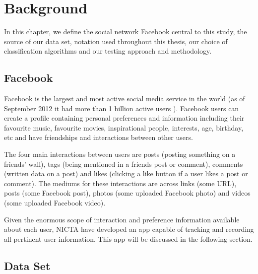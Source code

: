 
\chapter{Background}
\label{cha:back}

In this chapter, we define the social network Facebook central to this study, the source of our data set, notation used throughout 
this thesis, our choice of classification algorithms and our testing approach and methodology.

\section{Facebook}
\label{sec:data}

Facebook is the largest and most active social media service in the world (as of September 2012 it had more than 1 billion active users \cite{fbzise}).
Facebook users can create a profile containing personal preferences and information including their favourite music, favourite movies, 
inspirational people, interests, age, birthday, etc and have friendships and interactions between other users. 

The four main interactions between users are posts (posting something on a friends' wall), 
tags (being mentioned in a friends post or comment), comments (written data on a post) and likes (clicking a like button if a user 
likes a post or comment). The mediums for these interactions are across links (some URL), posts (some Facebook post), 
photos (some uploaded Facebook photo) and videos (some uploaded Facebook video).

Given the enormous scope of interaction and preference information available about each user, NICTA have developed an app capable of tracking 
and recording all pertinent user information. This app will be discussed in the following section.


\section{Data Set}
\label{sec:linkr}


